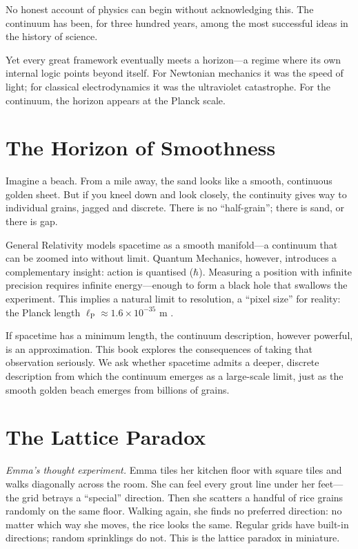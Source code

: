 \documentclass[11pt, a4paper, openany]{book}
\newcommand{\lP}{\ell_{\mathrm{P}}}
\begin{document}
No honest account of physics can begin without acknowledging this.
The continuum has been, for three hundred years, among the most
successful ideas in the history of science.

Yet every great framework eventually meets a horizon---a regime where
its own internal logic points beyond itself. For Newtonian mechanics it
was the speed of light; for classical electrodynamics it was the
ultraviolet catastrophe. For the continuum, the horizon appears at the
Planck scale.

\section{The Horizon of Smoothness}

Imagine a beach. From a mile away, the sand looks like a smooth,
continuous golden sheet. But if you kneel down and look closely, the
continuity gives way to individual grains, jagged and discrete. There is
no ``half-grain''; there is sand, or there is gap.

General Relativity models spacetime as a smooth manifold---a continuum
that can be zoomed into without limit. Quantum Mechanics, however,
introduces a complementary insight: action is quantised ($\hbar$).
Measuring a position with infinite precision requires infinite
energy---enough to form a black hole that swallows the experiment. This
implies a natural limit to resolution, a ``pixel size'' for reality:
the Planck length $\lP \approx 1.6 \times 10^{-35}$ m \cite{planck1899,garay1995}.

If spacetime has a minimum length, the continuum description, however
powerful, is an approximation. This book explores the consequences of
taking that observation seriously. We ask whether spacetime admits a
deeper, discrete description from which the continuum emerges as a
large-scale limit, just as the smooth golden beach emerges from billions
of grains.

\section{The Lattice Paradox}

\smallskip\noindent
\textit{Emma's thought experiment.}
Emma tiles her kitchen floor with square tiles and walks diagonally
across the room. She can feel every grout line under her feet---the grid
betrays a ``special'' direction. Then she scatters a handful of rice
grains randomly on the same floor. Walking again, she finds no preferred
direction: no matter which way she moves, the rice looks the same.
Regular grids have built-in directions; random sprinklings do not. This
is the lattice paradox in miniature.
\smallskip
\end{document}
